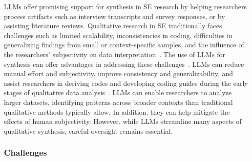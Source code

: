 LLMs offer promising support for synthesis in SE research by helping researchers process artifacts such as interview transcripts and survey responses, or by assisting literature reviews.
Qualitative research in SE traditionally faces challenges such as limited scalability, inconsistencies in coding, difficulties in generalizing findings from small or context-specific samples, and the influence of the researchers' subjectivity on data interpretation~\cite{DBLP:journals/ase/BanoHZT24}. 
The use of LLMs for synthesis can offer advantages in addressing these challenges~\cite{DBLP:journals/ase/BanoHZT24, barros2024largelanguagemodelqualitative, leça2024applicationsimplicationslargelanguage}.
LLMs can reduce manual effort and subjectivity, improve consistency and generalizability, and assist researchers in deriving codes and developing coding guides during the early stages of qualitative data analysis~\cite{DBLP:conf/chi/ByunVS23,DBLP:journals/ase/BanoHZT24}.
LLMs can enable researchers to analyze larger datasets, identifying patterns across broader contexts than traditional qualitative methods typically allow. In addition, they can help mitigate the effects of human subjectivity.
However, while LLMs streamline many aspects of qualitative synthesis, careful oversight remains essential.

\subsubsection{Challenges}

